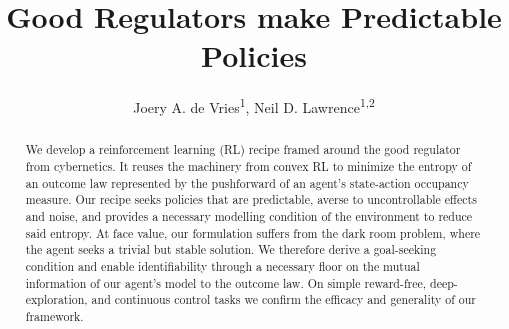\documentclass[10pt]{article}
\title{Good Regulators make Predictable Policies}
\author{Joery A. de Vries\textsuperscript{1}, Neil D. Lawrence\textsuperscript{1,2}}
\let\origaddcontentsline\addcontentsline %
\theoremstyle{plain}
\begin{document}
\makeCover
\maketitle

\begin{abstract}
We develop a reinforcement learning (RL) recipe framed around the good regulator from cybernetics.
It reuses the machinery from convex RL to minimize the entropy of an outcome law represented by the pushforward of an agent's state-action occupancy measure.
Our recipe seeks policies that are predictable, averse to uncontrollable effects and noise, and provides a necessary modelling condition of the environment to reduce said entropy.
At face value, our formulation suffers from the dark room problem, where the agent seeks a trivial but stable solution.
We therefore derive a goal-seeking condition and enable identifiability through a necessary floor on the mutual information of our agent's model to the outcome law.
On simple reward-free, deep-exploration, and continuous control tasks we confirm the efficacy and generality of our framework.
\end{abstract}












\beginSupplementaryMaterials
\appendix
\let\addcontentsline\origaddcontentsline
\tableofcontents

\end{document}
